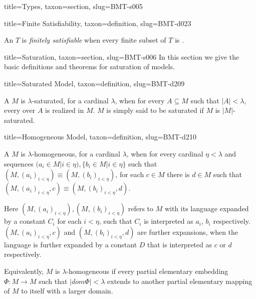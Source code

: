 \documentclass[a4paper]{article}
\begin{document}
\begin{tree}{title={Types}, taxon={section}, slug={BMT-s005}}
\begin{tree}{title={Finite Satisfiability}, taxon={definition}, slug={BMT-d023}}

    An  \(T\) is \emph{finitely satisfiable} when every finite subset of \(T\) is .

\end{tree}

\end{tree}


  
  
\begin{tree}{title={Saturation}, taxon={section}, slug={BMT-s006}}
In this section we give the basic definitions and theorems for saturation of models.
\begin{tree}{title={Saturated Model}, taxon={definition}, slug={BMT-d209}}

    A  \(M\) is \(\lambda\)-saturated, for a cardinal \(\lambda\), when for every \(A \subseteq  M\) such that \(|A|< \lambda\), every  over \(A\) is realized in \(M\). \(M\) is simply said to be saturated if \(M\) is \(|M|\)-saturated.

\end{tree}

\begin{tree}{title={Homogeneous Model}, taxon={definition}, slug={BMT-d210}}

    A  \(M\) is \(\lambda\)-homogeneous, for a cardinal \(\lambda\), 
    when for every cardinal \(\eta < \lambda\) and sequences \((a_i \in  M|i \in \eta ), \{ b_i \in  M|i \in \eta \}\) such that \((M,(a_i)_{i< \eta }) \equiv (M,(b_i)_{i< \eta })\), 
    for each \(c \in  M\) there is \(d \in  M\) such that \((M,(a_i)_{i< \eta },c) \equiv (M,(b_i)_{i< \eta },d)\). 

    Here \((M,(a_i)_{i< \eta }),(M,(b_i)_{i< \eta })\) refers to \(M\) with its language expanded by a constant \(C_i\) for each \(i< \eta\), such that \(C_i\) is interpreted as \(a_i\), \(b_i\) respectively. 
    \((M,(a_i)_{i< \eta },c)\) and \((M,(b_i)_{i< \eta },d)\) are further expansions, when the language is further expanded by a constant \(D\) that is interpreted as \(c\) or \(d\) respectively.

    Equivalently, \(M\) is \(\lambda\)-homogeneous if every partial elementary embedding \(\Phi :M \to  M\) such that \(|dom \Phi |< \lambda\) extends to another partial elementary mapping of \(M\) to itself with a larger domain.


\end{tree}
\end{tree}
\end{document}
